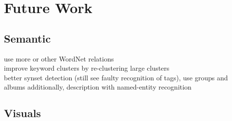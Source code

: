 %
\section{Future Work}
\label{sec_future}


\subsection{Semantic}
use more or other WordNet relations\\
improve keyword clusters by re-clustering large clusters\\
better synset detection (still see faulty recognition of tags), use groups and albums additionally, description with named-entity recognition

\subsection{Visuals}
